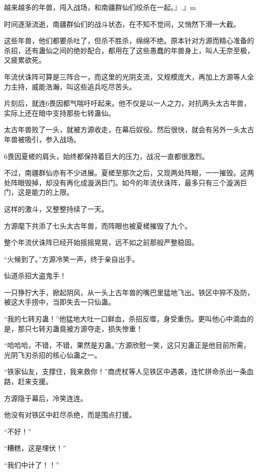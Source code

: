 
\begin{this_body}

越来越多的年兽，闯入战场，和南疆群仙们绞杀在一起。』.』m

时间逐渐流逝，南疆群仙们的战斗状态，在不知不觉间，又悄然下滑一大截。

这些年兽，他们都要杀吐了，但杀不胜杀，绵绵不绝。原本针对方源而精心准备的杀招，还有蛊仙之间的绝妙配合，都用在了这些愚蠢的年兽身上，叫人无奈至极，又疲累欲死。

年流伏诛阵可算是三阵合一，而这里的光阴支流，又规模庞大，再加上方源等人全力主持，威能浩瀚，叫这些追兵吃尽苦头。

片刻后，就连6畏因都气喘吁吁起来。他不仅是以一人之力，对抗两头太古年兽，实际上还在暗中支持那些七转蛊仙。

太古年兽败了一头，就被方源收走，在幕后奴役。然后很快，就会有另外一头太古年兽被吸引，参入战场。

6畏因夏槎的肩头，始终都保持着巨大的压力，战况一直都很激烈。

不过，南疆群仙亦有不少进展。夏槎至那次之后，又现两处阵眼，一一摧毁。这两处阵眼毁掉，却没有再化成漩涡巨门。如今的年流伏诛阵，最多只有三个漩涡巨门，这是能力的上限。

这样的激斗，又整整持续了一天。

方源麾下共添了七头太古年兽，而阵眼也被夏槎摧毁了九个。

整个年流伏诛阵已经开始摇摇晃晃，远不如之前那般严整稳固。

“火候到了。”方源冷笑一声，终于亲自出手。

仙道杀招大盗鬼手！

一只狰狞大手，掀起阴风，从一头上古年兽的嘴巴里猛地飞出。铁区中猝不及防，被这大手捞中，当即失去一只仙蛊。

“我的七转刃蛊！”他猛地大吐一口鲜血，杀招反噬，身受重伤。更叫他心中滴血的是，那只七转刃蛊竟被方源夺走，损失惨重！

“哈哈哈，不错，不错，果然是刃蛊。”方源欣慰一笑，这只刃蛊正是他目前所需，光阴飞刃杀招的核心仙蛊之一。

“铁家仙友，支撑住，我来救你！”商虎杖等人见铁区中遇袭，连忙拼命杀出一条血路，赶来支援。

方源隐于幕后，冷笑连连。

他没有对铁区中赶尽杀绝，而是围点打援。

“不好！”

“糟糕，这是埋伏！”

“我们中计了！！”


\end{this_body}
